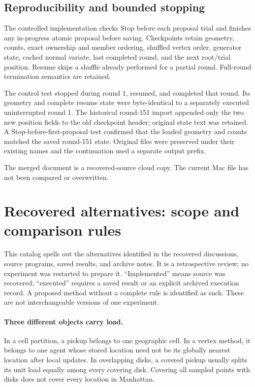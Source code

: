 \documentclass[11pt]{article}
\begin{document}
\subsection{Reproducibility and bounded stopping}
The controlled implementation checks Stop before each proposal trial and
finishes any in-progress atomic proposal before saving. Checkpoints retain
geometry, counts, exact ownership and member ordering, shuffled vertex
order, generator state, cached normal variate, last completed round, and
the next root/trial position. Resume skips a shuffle already performed
for a partial round. Full-round termination semantics are retained.

The control test stopped during round 1, resumed, and completed that round.
Its geometry and complete resume state were byte-identical to a separately
executed uninterrupted round 1. The historical round-151 import appended
only the two new position fields to the old checkpoint header; original
state text was retained. A Stop-before-first-proposal test confirmed that
the loaded geometry and counts matched the saved round-151 state.
Original files were preserved under their existing names and the
continuation used a separate output prefix.

The merged document is a recovered-source cloud copy. The current Mac file
 has not been compared or overwritten.


\clearpage
\section{Recovered alternatives: scope and comparison rules}
\label{sec:method-catalog}
This catalog spells out the alternatives identified in the recovered discussions,
source programs, saved results, and archive notes. It is a retrospective review;
no experiment was restarted to prepare it. ``Implemented'' means source was
recovered; ``executed'' requires a saved result or an explicit archived execution
record. A proposed method without a complete rule is identified as such.
These are not interchangeable versions of one experiment.

\paragraph{Three different objects carry load.}
In a cell partition, a pickup belongs to one geographic cell. In a vertex method,
it belongs to one agent whose stored location need not be its globally nearest
location after local updates. In overlapping disks, a covered pickup usually
splits its unit load equally among every covering disk. Covering all sampled
points with disks does not cover every location in Manhattan.
\end{document}
